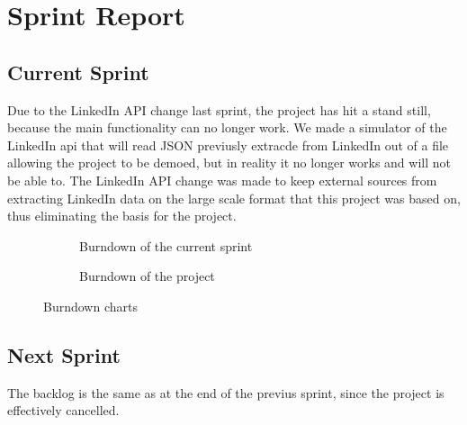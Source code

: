 \section{Sprint Report}

\subsection{Current Sprint}
Due to the LinkedIn API change last sprint, the project has hit a stand still, because the main functionality can no longer work. We made a simulator of the LinkedIn api that will read JSON previusly extracde from LinkedIn out of a file allowing the project to be demoed, but in reality it no longer works and will not be able to. The LinkedIn API change was made to keep external sources from extracting LinkedIn data on the large scale format that this project was based on, thus eliminating the basis for the project.

\begin{figure}[!ht]
    \centering
    \begin{subfigure}[b]{0.5\textwidth}
        \scalebox{.6}{}
        \caption{Burndown of the current sprint}
        \label{fig:burndownSprint}
    \end{subfigure}%
    \begin{subfigure}[b]{0.5\textwidth}
        \scalebox{.7}{}
        \caption{Burndown of the project}
        \label{fig:burndownProject}
    \end{subfigure}
    \caption{Burndown charts}
    \label{fig:burndown}
\end{figure}

\subsection{Next Sprint}
The backlog is the same as at the end of the previus sprint, since the project is effectively cancelled.
